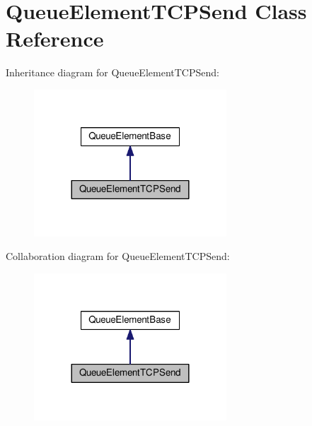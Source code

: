 \hypertarget{classQueueElementTCPSend}{}\section{Queue\+Element\+T\+C\+P\+Send Class Reference}
\label{classQueueElementTCPSend}


Inheritance diagram for Queue\+Element\+T\+C\+P\+Send\+:\nopagebreak
\begin{figure}[H]
\begin{center}
\leavevmode
\includegraphics[width=204pt]{classQueueElementTCPSend__inherit__graph}
\end{center}
\end{figure}


Collaboration diagram for Queue\+Element\+T\+C\+P\+Send\+:\nopagebreak
\begin{figure}[H]
\begin{center}
\leavevmode
\includegraphics[width=204pt]{classQueueElementTCPSend__coll__graph}
\end{center}
\end{figure}
